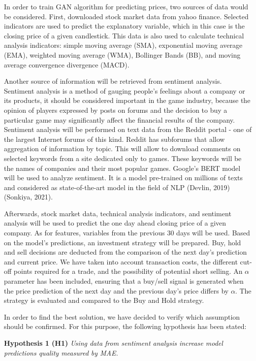 \documentclass[11pt]{article} %
\begin{document}
In order to train GAN algorithm for predicting prices, two sources of data would be considered. First, downloaded stock market data from yahoo finance. Selected indicators are used to predict the explanatory variable, which in this case is the closing price of a given candlestick. This data is also used to calculate technical analysis indicators: simple moving average (SMA), exponential moving average (EMA), weighted moving average (WMA), Bollinger Bands (BB), and moving average convergence divergence (MACD). 

Another source of information will be retrieved from sentiment analysis. Sentiment analysis is a method of gauging people's feelings about a company or its products, it should be considered important in the game industry, because the opinion of players expressed by posts on forums and the decision to buy a particular game may significantly affect the financial results of the company. Sentiment analysis will be performed on text data from the Reddit portal - one of the largest Internet forums of this kind. Reddit has subforums that allow aggregation of information by topic. This will allow to download comments on selected keywords from a site dedicated only to games. These keywords will be the names of companies and their most popular games. Google's BERT model will be used to analyze sentiment. It is a model pre-trained on millions of texts and considered as state-of-the-art model in the field of NLP (Devlin, 2019) (Sonkiya, 2021). 

Afterwards, stock market data, technical analysis indicators, and sentiment analysis will be used to predict the one day ahead closing price of a given company. As for features, variables from the previous 30 days will be used. Based on the model's predictions, an investment strategy will be prepared. Buy, hold and sell decisions are deducted from the comparison of the next day's prediction and current price. We have taken into account transaction costs, the different cut-off points required for a trade, and the possibility of potential short selling. An $\alpha$ parameter has been included, ensuring that a buy/sell signal is generated when the price prediction of the next day and the previous day's price differs by $\alpha$. The strategy is evaluated and compared to the Buy and Hold strategy.

In order to find the best solution, we have decided to verify which assumption should be confirmed. For this purpose, the following hypothesis has been stated: 

\textbf{Hypothesis 1 (H1)} \textit{Using data from sentiment analysis increase model predictions quality measured by MAE.}
\end{document}
